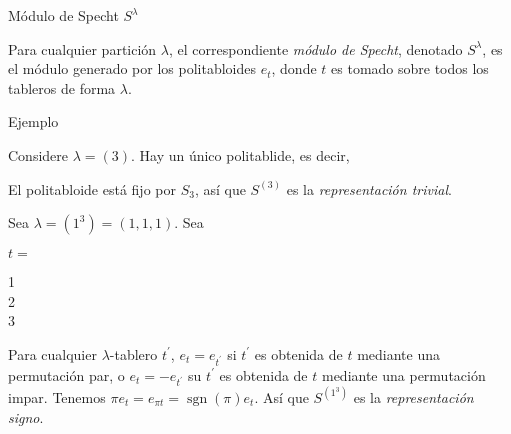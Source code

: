 \documentclass[final,xcolor=svgnames]{beamer}
\DeclareMathOperator{\sgn}{sgn}
\begin{document}
\begin{frame}{}
\begin{columns}
    \begin{column}{0.5\textwidth}
      \begin{block}{Módulo de Specht $S^{\lambda}$}
        \begin{scriptsize}
          Para cualquier partición $\lambda$, el correspondiente
          \textit{módulo de Specht}, denotado $S^{\lambda}$, es el
          módulo generado por los politabloides $e_{t}$, donde $t$ es tomado sobre todos los tableros de forma $\lambda$.
        \end{scriptsize}
      \end{block}

      \begin{block}{Ejemplo}
        \begin{scriptsize}
            Considere $\lambda=(3)$. Hay un único politablide, es decir,
            \begin{center}
            \end{center}
            El politabloide está fijo por $S_{3}$, así que $S^{(3)}$ es la
            \textit{representación trivial}.
        
            Sea $\lambda=(1^{3})=(1,1,1)$. Sea
            \begin{center}$t=$
              \begin{ytableau}
                1\\
                2\\
                3
              \end{ytableau}
            \end{center}
            Para cualquier $\lambda$-tablero $t^{'}$,
            $e_{t}=e_{t^{'}}$ si $t^{'}$ es obtenida de $t$ mediante
            una permutación par, o $e_{t}=-e_{t^{'}}$ su $t^{'}$ es
            obtenida de $t$ mediante una permutación impar. Tenemos $\pi
            e_{t}=e_{\pi t}=\sgn(\pi)e_{t}$. Así que $S^{(1^{3})}$ es la
            \textit{representación signo}.
         

\end{scriptsize}
\end{block}
\end{column}
\end{columns}
\end{frame}
\end{document}
